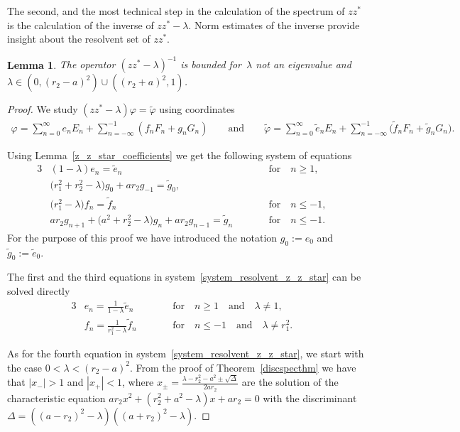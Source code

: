 \documentclass[11pt]{article}
\numberwithin{equation}{section}
\newtheorem{Lemma}[Theorem]{Lemma}
\begin{document}
The second, and the most technical step in the calculation of the spectrum of $zz^*$ is the calculation of the inverse
of $zz^*-\lambda$.
Norm estimates of the inverse provide insight about the resolvent set of $zz^*$.

\begin{Lemma}
\label{resolvent_z_z_star}
The operator $(zz^*-\lambda)^{-1}$ is bounded for~$\lambda$ not an eigenvalue and
$\lambda\in(0,(r_2-a)^2)\cup((r_2+a)^2,1)$.
\end{Lemma}

\begin{proof}
We study $(zz^*-\lambda)\varphi=\tilde{\varphi}$ using coordinates
\begin{gather*}
\varphi=\sum\limits_{n=0}^\infty e_nE_n+\sum\limits_{n=-\infty}^{-1}(f_nF_n+g_nG_n)
\qquad
\text{and}
\qquad
\tilde{\varphi}=\sum\limits_{n=0}^\infty \tilde{e}_nE_n+\sum\limits_{n=-\infty}^{-1}\big(\tilde{f}_nF_n+\tilde{g}_nG_n\big).
\end{gather*}

Using Lemma~\ref{z_z_star_coefficients} we get the following system of equations
\begin{alignat}{3}
&  (1-\lambda)e_n=\tilde{e}_n && \text{for}\quad n\ge1,&\nonumber
\\
&\big(r_1^2+ r_2^2-\lambda\big)g_0+ar_2g_{-1}=\tilde{g}_0,&&&\nonumber
\\
&\big(r_1^2-\lambda\big)f_n=\tilde{f}_n && \text{for}\quad n\le-1,&\nonumber
\\
& ar_2g_{n+1}+\big(a^2+r_2^2-\lambda\big)g_n+ar_2g_{n-1}=\tilde{g}_n \qquad & &\text{for}\quad n\le-1.& \label{system_resolvent_z_z_star}
\end{alignat}
For the purpose of this proof we have introduced the notation $g_0:=e_0$ and $\tilde{g}_0:=\tilde{e}_0$.

The f\/irst and the third equations in system~\eqref{system_resolvent_z_z_star} can be solved directly
\begin{alignat*}{3}%
& e_n=\frac{1}{1-\lambda}\tilde{e}_n \qquad && \text{for}\quad n\ge1
\quad
\text{and}
\quad
\lambda\neq 1, &
\\
& f_n=\frac{1}{r_1^2-\lambda}\tilde{f}_n \qquad && \text{for}\quad n\le-1
\quad
\text{and}
\quad
\lambda\neq r_1^2. &
\end{alignat*}

As for the fourth equation in system~\eqref{system_resolvent_z_z_star}, we start with the case $0<\lambda<(r_2-a)^2$.
From the proof of Theorem~\ref{discspecthm} we have that $|x_-|>1$ and $|x_+|<1$,
where $x_{\pm}=\frac{\lambda-r_2^2- a^2 \pm \sqrt{\Delta}}{2ar_2}$
are the solution of the characteristic equation $ar_2x^2+(r_2^2+a^2-\lambda)x+ar_2= 0$
with the discriminant $\Delta=((a-r_2)^2-\lambda)((a+r_2)^2-\lambda)$.


\end{proof}
\end{document}
